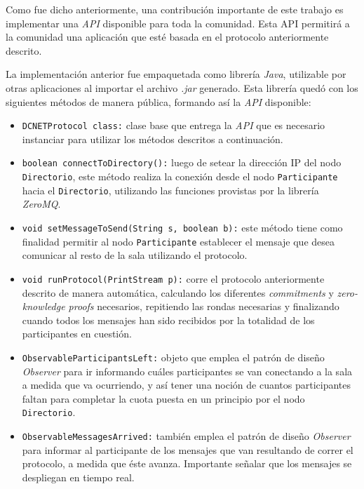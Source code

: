 Como fue dicho anteriormente, una contribución importante de este trabajo 
es implementar una \emph{API} disponible para toda la comunidad. Esta API 
permitirá a la comunidad una aplicación que esté basada en el protocolo 
anteriormente descrito. 

La implementación anterior fue empaquetada como librería \emph{Java}, 
utilizable por otras aplicaciones al importar el archivo \emph{.jar} generado. 
Esta librería quedó con los siguientes métodos de manera pública, formando así 
la \emph{API} disponible:

\begin{itemize}
    \item \texttt{DCNETProtocol class:} clase base que entrega la \emph{API} 
    que es necesario instanciar para utilizar los métodos descritos a 
    continuación. 
    \item \texttt{boolean connectToDirectory():} luego de setear la dirección 
    IP del nodo \texttt{Directorio}, este método realiza la conexión desde el 
    nodo \texttt{Participante} hacia el \texttt{Directorio}, utilizando las 
    funciones provistas por la librería \emph{ZeroMQ}.
    \item \texttt{void setMessageToSend(String s, boolean b):} este método 
    tiene como finalidad permitir al nodo \texttt{Participante} establecer el 
    mensaje que desea comunicar al resto de la sala utilizando el protocolo. 
    \item \texttt{void runProtocol(PrintStream p):} corre el protocolo 
    anteriormente descrito de manera automática, calculando los diferentes 
    \emph{commitments} y \emph{zero-knowledge proofs} necesarios, repitiendo 
    las rondas necesarias y finalizando cuando todos los mensajes han sido 
    recibidos por la totalidad de los participantes en cuestión.
    \item \texttt{ObservableParticipantsLeft:} objeto que emplea el patrón de 
    diseño \emph{Observer} para ir informando cuáles participantes se van 
    conectando a la sala a medida que va ocurriendo, y así tener una noción de 
    cuantos participantes faltan para completar la cuota puesta en un 
    principio por el nodo \texttt{Directorio}.
    \item \texttt{ObservableMessagesArrived:} también emplea el patrón de 
    diseño \emph{Observer} para informar al participante de los mensajes que 
    van resultando de correr el protocolo, a medida que éste avanza. 
    Importante señalar que los mensajes se despliegan en tiempo real.
\end{itemize}


